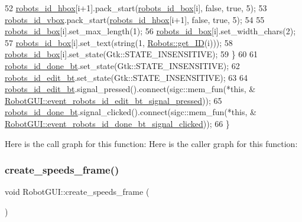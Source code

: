\begin{DoxyCode}
52         \hyperlink{class_robot_g_u_i_a9cbad34535e54602bf18610c56e003a8}{robots\_id\_hbox}[i+1].pack\_start(\hyperlink{class_robot_g_u_i_a1e475a8f99d5f0b3b29286731ddf0550}{robots\_id\_box}[i], \textcolor{keyword}{false}, \textcolor{keyword}{true}, 5);
53         \hyperlink{class_robot_g_u_i_ac64edc58bf0527d05a792fbe59237f32}{robots\_id\_vbox}.pack\_start(\hyperlink{class_robot_g_u_i_a9cbad34535e54602bf18610c56e003a8}{robots\_id\_hbox}[i+1], \textcolor{keyword}{false}, \textcolor{keyword}{true}, 5);
54 
55         \hyperlink{class_robot_g_u_i_a1e475a8f99d5f0b3b29286731ddf0550}{robots\_id\_box}[i].set\_max\_length(1);
56         \hyperlink{class_robot_g_u_i_a1e475a8f99d5f0b3b29286731ddf0550}{robots\_id\_box}[i].set\_width\_chars(2);
57         \hyperlink{class_robot_g_u_i_a1e475a8f99d5f0b3b29286731ddf0550}{robots\_id\_box}[i].set\_text(\textcolor{keywordtype}{string}(1, \hyperlink{class_robots_a306bb88b37b41cff35018d51d8228d65}{Robots::get\_ID}(i)));
58         \hyperlink{class_robot_g_u_i_a1e475a8f99d5f0b3b29286731ddf0550}{robots\_id\_box}[i].set\_state(Gtk::STATE\_INSENSITIVE);
59     \}
60 
61     \hyperlink{class_robot_g_u_i_ab69f2927774ee6e1feef6e1e175bf5ba}{robots\_id\_done\_bt}.set\_state(Gtk::STATE\_INSENSITIVE);
62     \hyperlink{class_robot_g_u_i_aa74c3aa318e937124b6bd8cc1139ffbd}{robots\_id\_edit\_bt}.set\_state(Gtk::STATE\_INSENSITIVE);
63 
64     \hyperlink{class_robot_g_u_i_aa74c3aa318e937124b6bd8cc1139ffbd}{robots\_id\_edit\_bt}.signal\_pressed().connect(sigc::mem\_fun(*\textcolor{keyword}{this}, &
      \hyperlink{class_robot_g_u_i_a37c09ff17bc02e83aa616ac798b87ee7}{RobotGUI::event\_robots\_id\_edit\_bt\_signal\_pressed}));
65     \hyperlink{class_robot_g_u_i_ab69f2927774ee6e1feef6e1e175bf5ba}{robots\_id\_done\_bt}.signal\_clicked().connect(sigc::mem\_fun(*\textcolor{keyword}{this}, &
      \hyperlink{class_robot_g_u_i_a92e50bc76f093abdd93e6c4eddb40a63}{RobotGUI::event\_robots\_id\_done\_bt\_signal\_clicked}));
66 \}
\end{DoxyCode}
Here is the call graph for this function\+:
Here is the caller graph for this function\+:
\mbox{\label{class_robot_g_u_i_a05b171a9b805af42e32ed9036478dafe}} 
\subsubsection{\texorpdfstring{create\+\_\+speeds\+\_\+frame()}{create\_speeds\_frame()}}
{\footnotesize\ttfamily void Robot\+G\+U\+I\+::create\+\_\+speeds\+\_\+frame (\begin{DoxyParamCaption}{ }\end{DoxyParamCaption})\hspace{0.3cm}{\ttfamily [private]}}

